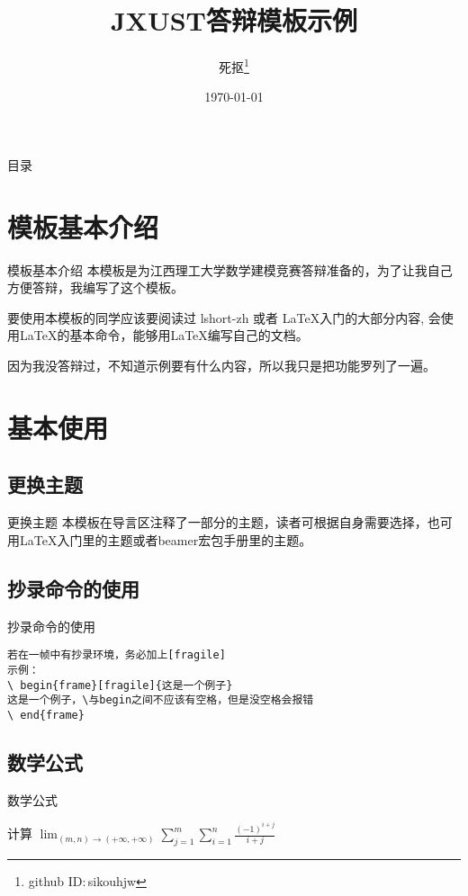 \documentclass{jxustbeamer}
\title{JXUST答辩模板示例}
\author{死抠\thanks{github ID:\,sikouhjw}}
\institute{\LaTeX{}学院}
\date{\scriptsize {\today}}
\begin{document}
	\begin{frame}
		\titlepage
	\end{frame}

    \begin{frame}{目录}
    	 \tableofcontents[hideallsubsections]
    \end{frame}

\section{模板基本介绍}
    \begin{frame}{模板基本介绍}
        本模板是为江西理工大学数学建模竞赛答辩准备的，为了让我自己方便答辩，我编写了这个模板。
        
        要使用本模板的同学应该要阅读过 lshort-zh\cite{lshort-zh} 或者 \LaTeX{}入门\cite{刘海洋}的大部分内容, 会使用\LaTeX{}的基本命令，能够用\LaTeX{}编写自己的文档。
        
        因为我没答辩过，不知道示例要有什么内容，所以我只是把功能罗列了一遍。
    \end{frame}
\section{基本使用}
\subsection{更换主题}
\begin{frame}{更换主题}
	本模板在导言区注释了一部分的主题，读者可根据自身需要选择，也可用\LaTeX{}入门\cite{刘海洋}里的主题或者beamer宏包手册里的主题。
\end{frame}
\subsection{抄录命令的使用}
    \begin{frame}[fragile]{抄录命令的使用}
\begin{verbatim}
若在一帧中有抄录环境，务必加上[fragile]
示例：
\ begin{frame}[fragile]{这是一个例子}
这是一个例子，\与begin之间不应该有空格，但是没空格会报错
\ end{frame}
\end{verbatim}
    \end{frame}
\subsection{数学公式}
\begin{frame}[fragile]{数学公式}

计算 $\displaystyle\lim_{(m,n)\to(+\infty,+\infty)}\sum_{j=1}^{m}\sum_{i=1}^{n}\frac{(-1)^{i+j}}{i+j}$

\end{frame}
\end{document}
